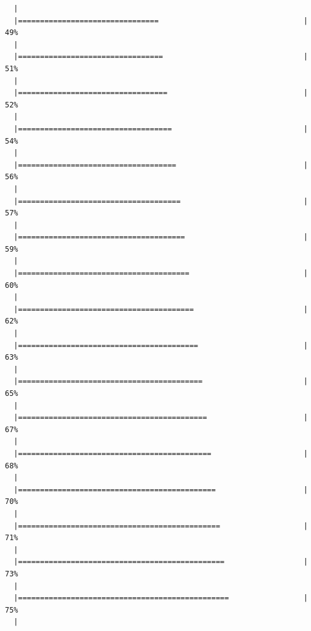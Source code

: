 \documentclass[]{book}
\begin{document}
\begin{verbatim}
  |                                                                       
  |================================                                 |  49%
  |                                                                       
  |=================================                                |  51%
  |                                                                       
  |==================================                               |  52%
  |                                                                       
  |===================================                              |  54%
  |                                                                       
  |====================================                             |  56%
  |                                                                       
  |=====================================                            |  57%
  |                                                                       
  |======================================                           |  59%
  |                                                                       
  |=======================================                          |  60%
  |                                                                       
  |========================================                         |  62%
  |                                                                       
  |=========================================                        |  63%
  |                                                                       
  |==========================================                       |  65%
  |                                                                       
  |===========================================                      |  67%
  |                                                                       
  |============================================                     |  68%
  |                                                                       
  |=============================================                    |  70%
  |                                                                       
  |==============================================                   |  71%
  |                                                                       
  |===============================================                  |  73%
  |                                                                       
  |================================================                 |  75%
  |                                                                       

\end{verbatim}
\end{document}
